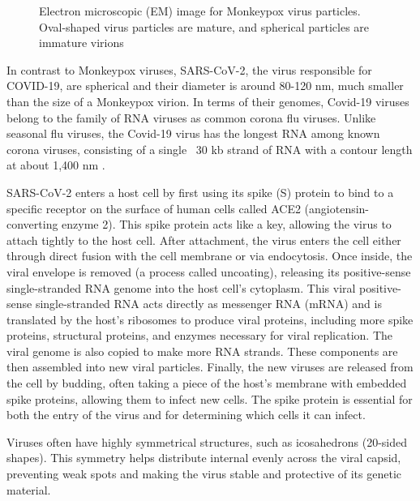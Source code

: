 \documentclass[12pt]{article}
\begin{document}
\begin{flushleft}
\begin{figure}[!ht]
  \centering  
  \caption{Electron microscopic (EM) image for
Monkeypox virus particles. Oval-shaped
virus particles are mature, and spherical
particles are immature virions \cite{goldsmith2003monkeypox}}
\end{figure}







In contrast to Monkeypox viruses, SARS-CoV-2, the virus responsible for COVID-19, are spherical and their diameter is around 80-120 nm, much smaller than the size of a Monkeypox virion. In terms of
their genomes, Covid-19 viruses belong to the family of
RNA viruses as common corona flu viruses. Unlike
seasonal flu viruses, the Covid-19 virus has the longest
RNA among known corona viruses, consisting of a single
~30 kb strand of RNA with a contour length at about
1,400 nm \cite{baron2020sars}\cite{Wu2022}.

SARS-CoV-2 enters a host cell by first using its spike (S) protein to bind to a specific receptor on the surface of human cells called ACE2 (angiotensin-converting enzyme 2). This spike protein acts like a key, allowing the virus to attach tightly to the host cell. After attachment, the virus enters the cell either through direct fusion with the cell membrane or via endocytosis. Once inside, the viral envelope is removed (a process called uncoating), releasing its positive-sense single-stranded RNA genome into the host cell’s cytoplasm. This viral positive-sense single-stranded RNA acts directly as messenger RNA (mRNA) and is translated by the host's ribosomes to produce viral proteins, including more spike proteins, structural proteins, and enzymes necessary for viral replication. The viral genome is also copied to make more RNA strands. These components are then assembled into new viral particles. Finally, the new viruses are released from the cell by budding, often taking a piece of the host’s membrane with embedded spike proteins, allowing them to infect new cells. The spike protein is essential for both the entry of the virus and for determining which cells it can infect.

Viruses often have highly symmetrical structures, such as icosahedrons (20-sided shapes). This symmetry helps distribute internal evenly across the viral capsid, preventing weak spots and making the virus stable and protective of its genetic material.



\end{flushleft}
\end{document}
